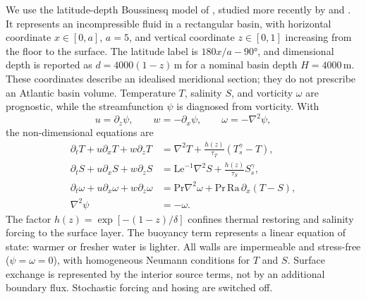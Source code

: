 \documentclass[12pt, a4paper]{article}
\begin{document}
We use the latitude-depth Boussinesq model of \citet{Dijkstra1997AMOCPDE}, studied more recently by \citet{Soons2025MostLikelyNoiseinduced} and \citet{Esclapez2026ConstructingEfficientScore}. It represents an incompressible fluid in a rectangular basin, with horizontal coordinate $x\in[0,a]$, $a=5$, and vertical coordinate $z\in[0,1]$ increasing from the floor to the surface. The latitude label is $180x/a-90°$, and dimensional depth is reported as $d=4000(1-z)\,\mathrm{m}$ for a nominal basin depth $H=4000\,\mathrm{m}$. These coordinates describe an idealised meridional section; they do not prescribe an Atlantic basin volume. Temperature $T$, salinity $S$, and vorticity $\omega$ are prognostic, while the streamfunction $\psi$ is diagnosed from vorticity. With
\begin{equation}
  u=\partial_z\psi,\qquad w=-\partial_x\psi,\qquad \omega=-\nabla^2\psi,
  \label{eq:vel_bous}
\end{equation}
the non-dimensional equations are
\begin{align}
  \partial_t T+u\partial_x T+w\partial_z T
    &=\nabla^2T+\frac{h(z)}{\tau_T}(T_s^\gamma-T), \label{eq:bous_T}\\
  \partial_t S+u\partial_x S+w\partial_z S
    &=\mathrm{Le}^{-1}\nabla^2S+\frac{h(z)}{\tau_S}S_s^\gamma, \label{eq:bous_S}\\
  \partial_t\omega+u\partial_x\omega+w\partial_z\omega
    &=\mathrm{Pr}\nabla^2\omega+\mathrm{Pr}\,\mathrm{Ra}\,\partial_x(T-S), \label{eq:bous_omega}\\
  \nabla^2\psi&=-\omega. \label{eq:bous_psi}
\end{align}
The factor $h(z)=\exp[-(1-z)/\delta]$ confines thermal restoring and salinity forcing to the surface layer. The buoyancy term represents a linear equation of state: warmer or fresher water is lighter. All walls are impermeable and stress-free ($\psi=\omega=0$), with homogeneous Neumann conditions for $T$ and $S$. Surface exchange is represented by the interior source terms, not by an additional boundary flux. Stochastic forcing and hosing are switched off.
\end{document}
